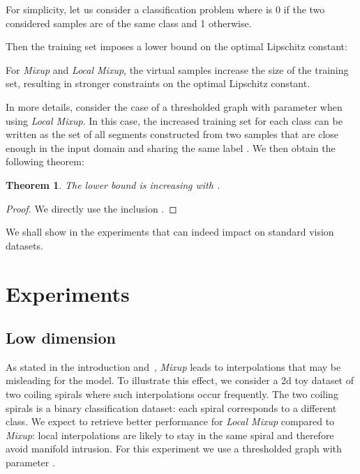 \documentclass[twoside]{article}
\newtheorem{theorem}{Theorem}[section]
\numberwithin{intassumption}{assumption}
\begin{document}
For simplicity, let us consider a classification problem where  is 0 if the two considered samples are of the same class and 1 otherwise.

Then the training set imposes a lower bound on the optimal Lipschitz constant:


For \emph{Mixup} and \emph{Local Mixup}, the virtual samples increase the size of the training set, resulting in stronger constraints on the optimal Lipschitz constant.

In more details, consider the case of a thresholded graph with parameter  when using \emph{Local Mixup}. In this case, the increased training set for each class  can be written as  the set of all segments constructed from two samples that are close enough in the input domain and sharing the same label . We then obtain the following theorem:

\begin{theorem}\label{theoremLip}
    The lower bound  is increasing with .
\end{theorem}
\begin{proof}
We directly use the inclusion .
\end{proof}

We shall show in the experiments that  can indeed impact  on standard vision datasets.

\section{Experiments}
\subsection{Low dimension}
As stated in the introduction and~\citep{guo2019mixup}, \emph{Mixup} leads to interpolations that may be misleading for the model. To illustrate this effect, we consider a 2d toy dataset of two coiling spirals where such interpolations occur frequently. The two coiling spirals is a binary classification dataset: each spiral corresponds to a different class. We expect to retrieve better performance for \emph{Local Mixup} compared to \emph{Mixup}: local interpolations are likely to stay in the same spiral and therefore avoid manifold intrusion. For this experiment we use a thresholded graph with parameter .
\end{document}
